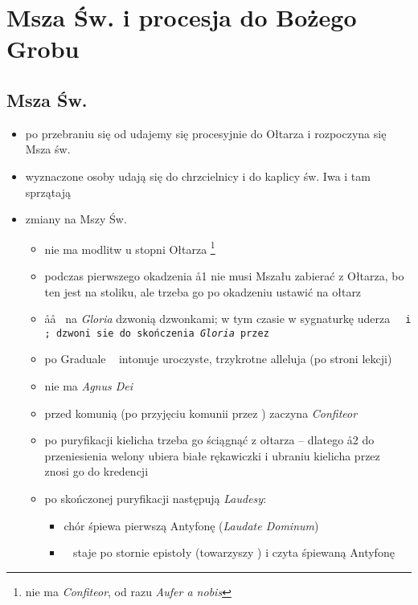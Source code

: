 \section{Msza Św. i procesja do Bożego Grobu}

\subsection{Msza Św.}

\begin{itemize}
	\item po przebraniu się od udajemy się procesyjnie do Ołtarza i rozpoczyna
	      się Msza św.
	\item wyznaczone osoby udają się do chrzcielnicy i do kaplicy św. Iwa i tam
	      sprzątają
	\item zmiany na Mszy Św.
	      \begin{itemize}
		      \item nie ma modlitw u stopni Ołtarza \footnote{nie ma \textit{Confiteor},
			            od razu \textit{Aufer a nobis}}
		      \item podczas pierwszego okadzenia \aa1 nie musi Mszału zabierać z Ołtarza,
		            bo ten jest na stoliku, ale trzeba go po okadzeniu ustawić na ołtarz
		      \item \aa\aa~ na \textit{Gloria} dzwonią dzwonkami; w tym czasie w
		            sygnaturkę uderza \tt~ i \zz; dzwoni sie do skończenia
		            \textit{Gloria}	przez \ii
		      \item po Graduale \ii~ intonuje uroczyste, trzykrotne alleluja
		            (po stroni lekcji)
		      \item nie ma \textit{Agnus Dei}
		      \item przed komunią (po przyjęciu komunii przez \ii)  zaczyna
		            \textit{Confiteor}
		      \item po puryfikacji kielicha trzeba go ściągnąć z ołtarza -- dlatego
		            \aa2 do przeniesienia welony ubiera białe rękawiczki i ubraniu
		            kielicha przez \ii~ znosi go do kredencji
		      \item po skończonej puryfikacji następują \textit{Laudesy}:
		            \begin{itemize}
			            \item chór śpiewa pierwszą Antyfonę (\textit{Laudate Dominum})
			            \item \ii~ staje po stornie epistoły (towarzyszy ) i
			                  czyta śpiewaną Antyfonę

\end{itemize}
\end{itemize}
\end{itemize}
